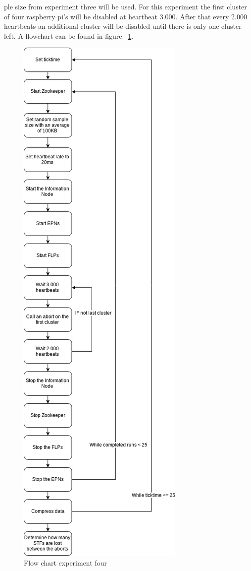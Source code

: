 ple size from experiment three will be used. For this experiment the first cluster of four raspberry pi's will be disabled at heartbeat 3.000. After that every 2.000 heartbeats an additional cluster will be disabled until there is only one cluster left. A flowchart can be found in figure ~\ref{fig:FlowChart4}.

\begin{figure}[htb]
	\centering
	\includegraphics[width=\textwidth,height=\textheight,keepaspectratio]{./graphics/ex4.png}
	\caption{Flow chart experiment four}
	\label{fig:FlowChart4}
\end{figure}

